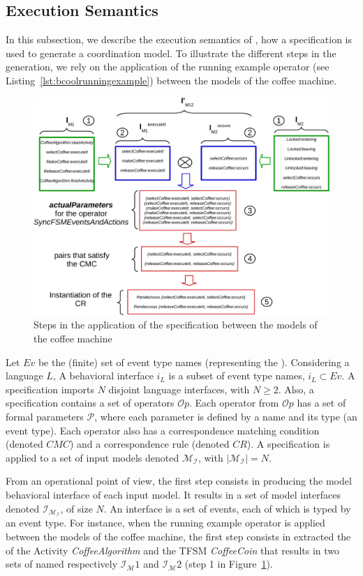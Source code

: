 \subsection{Execution Semantics}
In this subsection, we describe the execution semantics of \bcool, \ie how a \bcool specification is used to generate a coordination model. To illustrate the different steps in the generation, we rely on the application of the running example operator (see Listing~\ref{lst:bcoolrunningexample}) between the models of the coffee machine.

\begin{figure}
	\center
	\includegraphics[width=1\textwidth]{bcool/figs/semantics}
	\caption{Steps in the application of the \bcool specification between the models of the coffee machine}
	\label{fig:semantics}
\end{figure}

Let $Ev$ be the (finite) set of event type names (representing the \dse). Considering a language $L$, A behavioral interface $i_L$ is a subset of event type names, $i_L \subset Ev$. A \bcool specification imports $N$ disjoint language interfaces, with $N\geq 2$. Also, a \bcool specification contains a set of operators $\mathcal{O}p$. Each operator from $\mathcal{O}p$ has a set of formal parameters $\mathcal{P}$, where each parameter is defined by a name and its type (\ie an event type). Each operator also has a correspondence matching condition (denoted $CMC$) and a correspondence rule (denoted $CR$). A \bcool specification is applied to a set of input models denoted $\mathcal{M_I}$, with $|\mathcal{M_I}| = N$.

From an operational point of view, the first step consists in producing the model behavioral interface of each input model. It results in a set of model interfaces denoted $\mathcal{I_{M_I}}$, of size $N$. An interface is a set of events, each of which is typed by an event type. For instance, when the running example operator is applied between the models of the coffee machine, the first step consists in extracted the \mse of the Activity \emph{CoffeeAlgorithm} and the TFSM \emph{CoffeeCoin} that results in two sets of \mse named respectively $\mathcal{I_M}{1}$ and $\mathcal{I_M}{2}$ (step 1 in Figure~\ref{fig:semantics}).

